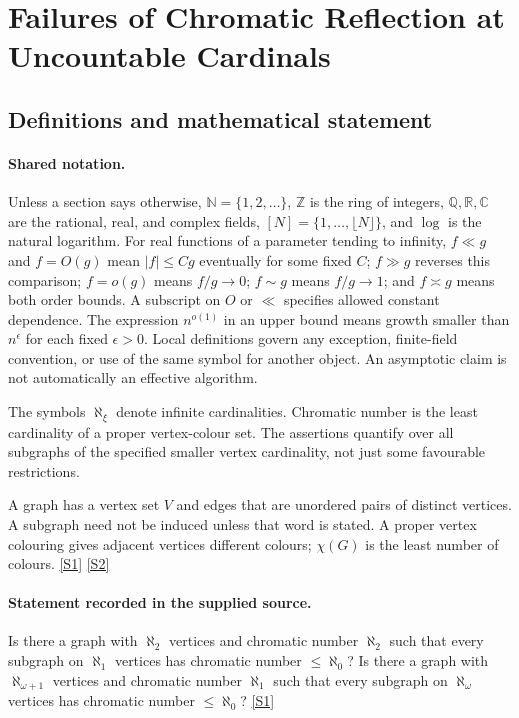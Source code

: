 \documentclass[11pt,a4paper]{article}
\newcommand{\N}{\mathbb{N}}
\newcommand{\Z}{\mathbb{Z}}
\newcommand{\Q}{\mathbb{Q}}
\newcommand{\R}{\mathbb{R}}
\newcommand{\C}{\mathbb{C}}
\newcommand{\sref}[2]{\hyperlink{source:#1:#2}{[S#2]}}
\begin{document}
\section{Failures of Chromatic Reflection at Uncountable Cardinals}\label{statement}


\subsection{Definitions and mathematical statement}

\paragraph{Shared notation.}Unless a section says otherwise, $\N=\{1,2,\ldots\}$,
$\Z$ is the ring of integers, $\Q,\R,\C$ are the rational, real, and complex
fields, $[N]=\{1,\ldots,\lfloor N\rfloor\}$, and $\log$ is the natural
logarithm. For real functions of a parameter tending to infinity,
$f\ll g$ and $f=O(g)$ mean $|f|\leq Cg$ eventually for some fixed $C$;
$f\gg g$ reverses this comparison; $f=o(g)$ means $f/g\to0$;
$f\sim g$ means $f/g\to1$; and $f\asymp g$ means both order bounds.
A subscript on $O$ or $\ll$ specifies allowed constant dependence.
The expression $n^{o(1)}$ in an upper bound means growth smaller than
$n^\epsilon$ for each fixed $\epsilon>0$. Local definitions govern any
exception, finite-field convention, or use of the same symbol for another
object. An asymptotic claim is not automatically an effective algorithm.



The symbols $\aleph_\xi$ denote infinite cardinalities. Chromatic number is the least cardinality of a proper vertex-colour set. The assertions quantify over all subgraphs of the specified smaller vertex cardinality, not just some favourable restrictions.

A graph has a vertex set $V$ and edges that are unordered pairs of distinct vertices. A subgraph need not be induced unless that word is stated. A proper vertex colouring gives adjacent vertices different colours; $\chi(G)$ is the least number of colours. \sref{statement}{1} \sref{statement}{2}

\paragraph{Statement recorded in the supplied source.}
Is there a graph with $\aleph_2$ vertices and chromatic number $\aleph_2$ such that every subgraph on $\aleph_1$ vertices has chromatic number $\leq\aleph_0$?
Is there a graph with $\aleph_{\omega+1}$ vertices and chromatic number $\aleph_1$ such that every subgraph on $\aleph_\omega$ vertices has chromatic number $\leq\aleph_0$? \sref{statement}{1}
\end{document}
